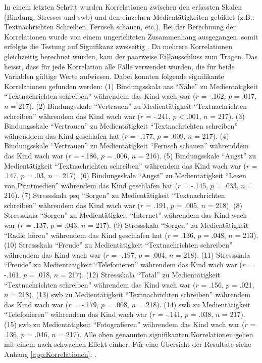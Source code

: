 In einem letzten Schritt wurden Korrelationen zwischen den erfassten Skalen (Bindung, Stresses und \acrshort{swb}) und den einzelnen Medientätigkeiten gebildet (z.B.: Textnachrichten Schreiben, Fernseh schauen, etc.).  Bei der Berechnung der Korrelationen wurde von einem ungerichteten Zusammenhang ausgegangen, somit erfolgte die Testung auf Signifikanz zweiseitig \cite{UniversitatZurich2018}. Da mehrere Korrelationen gleichzeitig berechnet wurden, kam der paarweise Fallausschluss zum Tragen. Das heisst, dass für jede Korrelation alle Fälle verwendet wurden, die für beide Variablen gültige Werte aufwiesen. Dabei konnten folgende signifikante Korrelationen gefunden werden: (1) Bindungsskala \acrshort{aas} \enquote{Nähe} zu Medientätigkeit \enquote{Textnachrichten schreiben} währendem das Kind wach war ($r$ = -.162, $p$ = .017, $n$ = 217). (2) Bindungsskale \enquote{Vertrauen} zu Medientätigkeit \enquote{Textnachrichten schreiben} währendem das Kind wach war ($r$ = -.241, $p$ < .001, $n$ = 217). (3) Bindungsskale \enquote{Vertrauen} zu Medientätigkeit \enquote{Textnachrichten schreiben} währenddem das Kind geschlafen hat ($r$ = -.177, $p$ = .009, $n$ = 217). (4) Bindungsskale \enquote{Vertrauen} zu Medientätigkeit \enquote{Fernseh schauen} währenddem das Kind wach war ($r$ = -.186, $p$ = .006, $n$ = 216). (5) Bindungsskale \enquote{Angst} zu Medientätigkeit \enquote{Textnachrichten schreiben} währendem das Kind wach war ($r$ = .147, $p$ = .03, $n$ = 217). (6) Bindungsskale \enquote{Angst} zu Medientätigkeit \enquote{Lesen von Printmedien} währendem das Kind geschlafen hat ($r$ = -.145, $p$ = .033, $n$ = 216). (7) Stressskala \acrshort{psq} \enquote{Sorgen} zu Medientätigkeit \enquote{Textnachrichten schreiben} währendem das Kind wach war ($r$ = .191, $p$ = .005, $n$ = 218). (8) Stressskala \enquote{Sorgen} zu Medientätigkeit \enquote{Internet} währendem das Kind wach war ($r$ = .137, $p$ = .043, $n$ = 217). (9) Stressskala \enquote{Sorgen} zu Medientätigkeit \enquote{Radio hören} währendem das Kind geschlafen hat ($r$ = .136, $p$ = .048, $n$ = 213). (10) Stressskala \enquote{Freude} zu Medientätigkeit \enquote{Textnachrichten schreiben} währendem das Kind wach war ($r$ = -.197, $p$ = .004, $n$ = 218). (11) Stressskala \enquote{Freude} zu Medientätigkeit \enquote{Telefonieren} währendem das Kind wach war ($r$ = -.161, $p$ = .018, $n$ = 217). (12) Stressskala \enquote{Total} zu Medientätigkeit \enquote{Textnachrichten schreiben} währendem das Kind wach war ($r$ = .156, $p$ = .021, $n$ = 218). (13) \acrfull{swb} zu Medientätigkeit \enquote{Textnachrichten schreiben} währendem das Kind wach war ($r$ = -.179, $p$ = .008, $n$ = 218). (14) \acrshort{swb} zu Medientätigkeit \enquote{Telefonieren} währendem das Kind wach war ($r$ = -.141, $p$ = .038, $n$ = 217). (15) \acrshort{swb} zu Medientätigkeit \enquote{Fotografieren} währendem das Kind wach war ($r$ = .136, $p$ = .046, $n$ = 217). Alle oben genannten signifikanten Korrelationen gehen mit einem nach  schwachen Effekt einher. Für eine Übersicht der Resultate siehe Anhang \ref{app:Korrelationen}: \textit{}.




